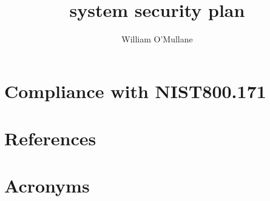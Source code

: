 \documentclass[OPS,lsstdraft,authoryear,toc]{lsstdoc}
\title{\PZ system security plan}
\author{%
William O'Mullane
}
\date{\vcsDate}
\begin{document}
\maketitle



\appendix
\section{Compliance with NIST800.171} \label{sec:compliance}


\section{References} \label{sec:bib}
\renewcommand{\refname}{} %


\section{Acronyms} \label{sec:acronyms}

\end{document}
